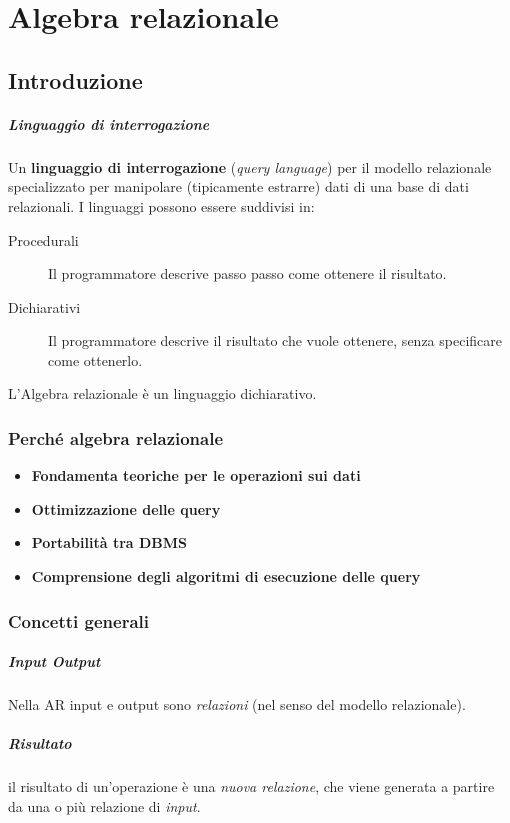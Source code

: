 \chapter{Algebra relazionale}
\thispagestyle{chapterInit}
\section{Introduzione}
    \paragraph{Linguaggio di interrogazione} Un \textbf{linguaggio di interrogazione} (\textit{query language}) per il modello relazionale specializzato per manipolare (tipicamente estrarre) dati di una base di dati relazionali. I linguaggi possono essere suddivisi in:
        \begin{description}
            \item[Procedurali] Il programmatore descrive passo passo come ottenere il risultato.
            \item[Dichiarativi] Il programmatore descrive il risultato che vuole ottenere, senza specificare come ottenerlo.
        \end{description}
    L'Algebra relazionale è un linguaggio dichiarativo.
    \subsection{Perché algebra relazionale}
        \begin{itemize}
            \item \textbf{Fondamenta teoriche per le operazioni sui dati}
            \item \textbf{Ottimizzazione delle query}
            \item \textbf{Portabilità tra DBMS}
            \item \textbf{Comprensione degli algoritmi di esecuzione delle query}
        \end{itemize}
    \subsection{Concetti generali}
        \paragraph{Input Output} Nella AR input e output sono \textit{relazioni} (nel senso del modello relazionale).
        \paragraph{Risultato} il risultato di un'operazione è una \textit{nuova relazione}, che viene generata a partire da una o più relazione di \textit{input}.
